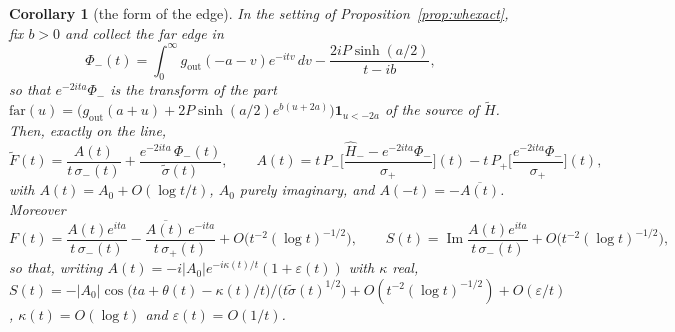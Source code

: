 \documentclass[11pt]{article}
\newtheorem{corollary}[theorem]{Corollary}
\theoremstyle{definition}
\theoremstyle{remark}
\DeclareMathOperator{\Imm}{Im}
\begin{document}
\begin{corollary}[the form of the edge]\label{cor:edgeform}
In the setting of Proposition~\ref{prop:whexact}, fix $b>0$ and collect the far edge in
\[
\Phi_-(t)=\int_0^\infty g_{\mathrm{out}}(-a-v)e^{-itv}\,dv-\frac{2iP\sinh(a/2)}{t-ib},
\]
so that $e^{-2ita}\Phi_-$ is the transform of the part $\mathrm{far}(u)=\big(g_{\mathrm{out}}(a+u)+2P\sinh(a/2)e^{b(u+2a)}\big)\mathbf 1_{u<-2a}$ of the source of $\tilde H$. Then, exactly on the line,
\begin{equation}\label{eq:edgeform}
\tilde F(t)=\frac{A(t)}{t\,\sigma_-(t)}+\frac{e^{-2ita}\,\Phi_-(t)}{\tilde\sigma(t)},\qquad A(t)=t\,P_-\Big[\frac{\hat H_--e^{-2ita}\Phi_-}{\sigma_+}\Big](t)-t\,P_+\Big[\frac{e^{-2ita}\Phi_-}{\sigma_+}\Big](t),
\end{equation}
with $A(t)=A_0+O(\log t/t)$, $A_0$ purely imaginary, and $A(-t)=-\overline{A(t)}$. Moreover
\begin{equation}\label{eq:mirror}
F(t)=\frac{A(t)e^{ita}}{t\,\sigma_-(t)}-\frac{\overline{A(t)}\,e^{-ita}}{t\,\sigma_+(t)}+O\big(t^{-2}(\log t)^{-1/2}\big),\qquad S(t)=\Imm\frac{A(t)e^{ita}}{t\,\sigma_-(t)}+O\big(t^{-2}(\log t)^{-1/2}\big),
\end{equation}
so that, writing $A(t)=-i|A_0|e^{-i\kappa(t)/t}(1+\varepsilon(t))$ with $\kappa$ real, $S(t)=-|A_0|\cos\big(ta+\theta(t)-\kappa(t)/t\big)\big/\big(t\tilde\sigma(t)^{1/2}\big)+O(t^{-2}(\log t)^{-1/2})+O(\varepsilon/t)$, $\kappa(t)=O(\log t)$ and $\varepsilon(t)=O(1/t)$.
\end{corollary}
\end{document}
